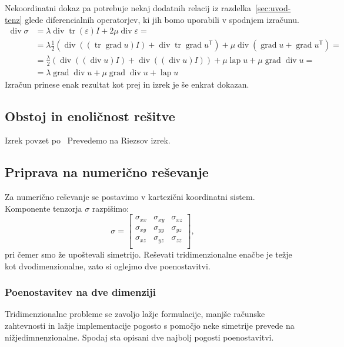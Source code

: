 \documentclass[12pt,a4paper]{article}
\theoremstyle{definition} %
\theoremstyle{plain} %
\numberwithin{equation}{section}
\newcommand{\T}{\mathsf{T}}
\newcommand{\lap}{\operatorname{lap}}
\renewcommand{\div}{\operatorname{div}}
\newcommand{\grad}{\operatorname{grad}}
\newcommand{\eps}{\varepsilon}
\newcommand{\ts}{\sigma}
\DeclareMathOperator{\tr}{tr}
\begin{document}
Nekoordinatni dokaz pa potrebuje nekaj dodatnih relacij iz
razdelka~\ref{sec:uvod-tenz} glede diferencialnih operatorjev, ki jih bomo
uporabili v spodnjem izračunu.
\begin{align*}
  \div\ts &= \lambda \div \tr(\eps) I + 2\mu \div \eps = \\ &=
  \lambda \frac12(\div((\tr\grad u)I) + \div\tr\grad u^\T) + \mu \div(\grad u + \grad
  u^\T) = \\
  &= \frac{\lambda}{2} (\div((\div u) I) + \div( (\div u)I)) + \mu \lap u + \mu
  \grad \div u = \\
  &= \lambda \grad \div u + \mu \grad \div u + \lap u
\end{align*}
Izračun prinese enak rezultat kot prej in izrek je še enkrat dokazan.
\endproof

\subsection{Obstoj in enoličnost rešitve}
Izrek povzet po~\cite[izrek 3.15.1, str.\ 226]{lebedev2009introduction}
Prevedemo na Riezsov izrek.

\subsection{Priprava na numerično reševanje}
Za numerično reševanje se postavimo v kartezični koordinatni sistem.
Komponente tenzorja $\ts$ razpišimo:
\[
  \ts =
  \begin{bmatrix}
    \ts_{xx} & \ts_{xy} & \ts_{xz} \\
    \ts_{xy} & \ts_{yy} & \ts_{yz} \\
    \ts_{xz} & \ts_{yz} & \ts_{zz} \\
  \end{bmatrix},
\]
pri čemer smo že upoštevali simetrijo. Reševati tridimenzionalne enačbe je težje
kot dvodimenzionalne, zato si oglejmo dve poenostavitvi.

\subsubsection{Poenostavitev na dve dimenziji}
Tridimenzionalne probleme se zavoljo lažje formulacije, manjše računske
zahtevnosti in lažje implementacije pogosto s pomočjo neke simetrije prevede na
nižjedimnenzionalne. Spodaj sta opisani dve najbolj pogosti poenostavitvi.
\end{document}
